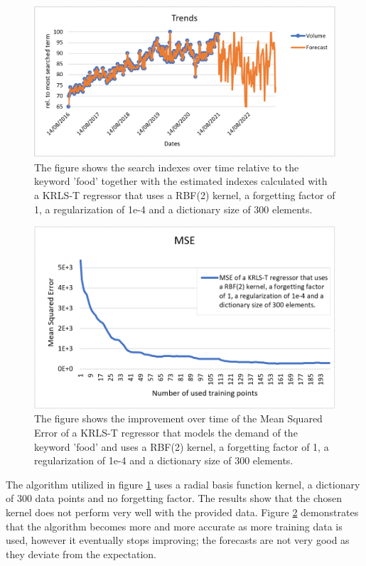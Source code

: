 \begin{figure}[H]
	\centering
	\includegraphics[scale=0.6]{img/exp1.png}
	\caption{The figure shows the search indexes over time relative to the keyword 'food' together with the estimated indexes calculated with a KRLS-T regressor that uses a RBF(2) kernel, a forgetting factor of 1, a regularization of 1e-4 and a dictionary size of 300 elements.}
	\label{Implementation:Trends 1}
\end{figure} 

\begin{figure}[H]
	\centering
	\includegraphics[scale=0.7]{img/exp1_mse.png}
	\caption{The figure shows the improvement over time of the Mean Squared Error of a KRLS-T regressor that models the demand of the keyword 'food' and uses a RBF(2) kernel, a forgetting factor of 1, a regularization of 1e-4 and a dictionary size of 300 elements.}
	\label{Implementation:MSE 1}
\end{figure} 

 
The algorithm utilized in figure \ref{Implementation:Trends 1} uses a radial basis function kernel, a dictionary of 300 data points and no forgetting factor. The results show that the chosen kernel does not perform very well with the provided data. Figure \ref{Implementation:MSE 1} demonstrates that the algorithm becomes more and more accurate as more training data is used, however it eventually stops improving; the forecasts are not very good as they deviate from the expectation. 

